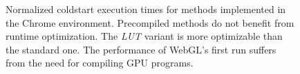 \begin{figure}

    \label{plot:coldstart-chrome}
    \caption{Normalized coldstart execution times for methods implemented in the Chrome environment. Precompiled methods do not benefit from runtime optimization. The \textit{LUT} variant is more optimizable than the standard one. The performance of WebGL's first run suffers from the need for compiling GPU programs.}
\end{figure}
